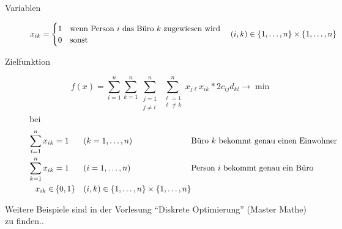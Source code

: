 \begin{description}
	\item[Variablen] $x_{ik} = \begin{cases}
	1 & \text{wenn Person $i$ das Büro $k$ zugewiesen wird} \\ 0 & \text{sonst}
	\end{cases} \quad (i,k) \in \left\{ 1, \dots , n \right\} \times \left\{ 1, \dots , n \right\}$
	
	\item[Zielfunktion]
	\begin{equation*}
		f(x) = \sum_{i=1}^n \sum_{k=1}^n \sum\limits_{\substack{j=1 \\ j \neq i}}^n \sum\limits_{\substack{\ell =1 \\ \ell \neq k}}^n x_{j \ell} x_{i k} * 2c_{ij} d_{kl} \to \min
	\end{equation*}
	bei
	\begin{equation*}
		\begin{alignedat}{3}
		\sum_{i=1}^n x_{ik} &= 1 \quad &&(k = 1, \dots, n) \quad &&\text{Büro $k$ bekommt genau einen Einwohner} \\
		\sum_{k=1}^n x_{ik} &= 1 &&(i = 1, \dots, n) &&\text{Person $i$ bekommt genau ein Büro} \\
		x_{ik} \in &\left\{ 0,1 \right\} \quad &&(i,k) \in \left\{ 1, \dots , n \right\} \times \left\{ 1, \dots , n \right\} &&
		\end{alignedat}
	\end{equation*}
\end{description}


Weitere Beispiele sind in der Vorlesung \enquote{Diskrete Optimierung} (Master Mathe) zu finden..